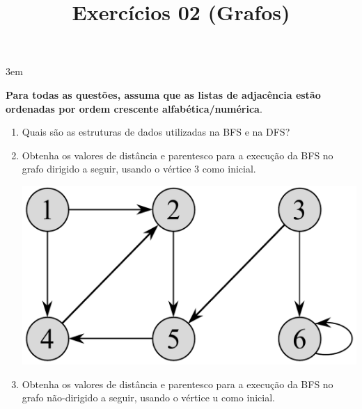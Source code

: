 \documentclass[a4paper,10pt]{article}
\title{Exercícios 02 (Grafos)}
\begin{document}
\maketitle

\emergencystretch 3em

{\raggedright \textbf{Para todas as questões, assuma que as listas de adjacência estão ordenadas por ordem crescente alfabética/numérica}.}

\bigskip

\begin{multicols*}{2}
\setlength{\leftmargini}{0pt}
\begin{enumerate}
  \item Quais são as estruturas de dados utilizadas na BFS e na DFS? %

  \item Obtenha os valores de distância e parentesco para a execução da BFS no grafo dirigido a seguir, usando o vértice 3 como inicial.

  \begin{center}
    \includegraphics[width=.8\linewidth]{graph2.png}
  \end{center}

  \item Obtenha os valores de distância e parentesco para a execução da BFS no grafo não-dirigido a seguir, usando o vértice u como inicial.


\end{enumerate}
\end{multicols*}
\end{document}
